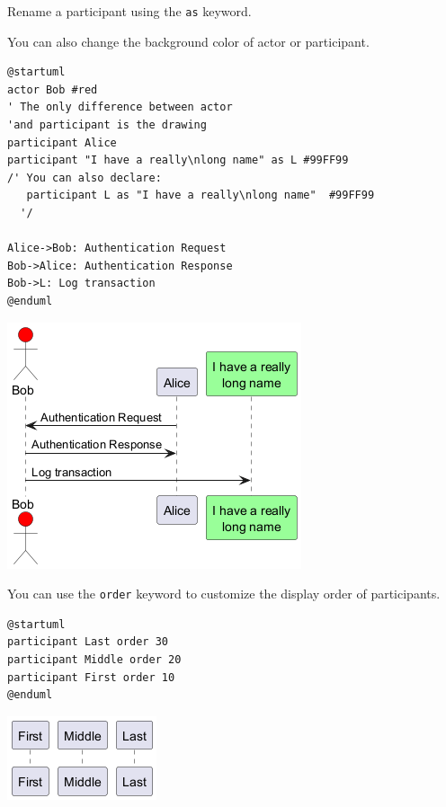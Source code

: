 Rename a participant using the \texttt{as} keyword.


You can also change the background color of
actor or participant.


\begin{verbatim}
@startuml
actor Bob #red
' The only difference between actor
'and participant is the drawing
participant Alice
participant "I have a really\nlong name" as L #99FF99
/' You can also declare:
   participant L as "I have a really\nlong name"  #99FF99
  '/

Alice->Bob: Authentication Request
Bob->Alice: Authentication Response
Bob->L: Log transaction
@enduml
\end{verbatim}
\begin{center}
\includegraphics[scale=0.60]{imgw/img-c5cddd003652cd1b3109cdc71b9987d8.png}
\end{center}


You can use the \texttt{order} keyword to customize the display order of participants.


\begin{verbatim}
@startuml
participant Last order 30
participant Middle order 20
participant First order 10
@enduml
\end{verbatim}
\begin{center}
\includegraphics[scale=0.60]{imgw/img-65dfd7ae9330e7e48e090871dc8b601f.png}
\end{center}
%
%
